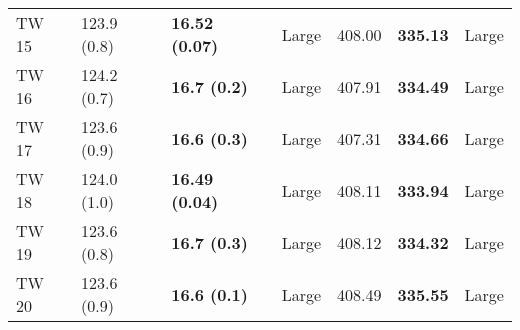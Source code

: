 \begin{tabular}{lllllll}
 TW 15 &       123.9 (0.8) &  \textbf{16.52 (0.07)} &       Large &                  408.00 &          \textbf{335.13} &       Large \\
 TW 16 &       124.2 (0.7) &    \textbf{16.7 (0.2)} &       Large &                  407.91 &          \textbf{334.49} &       Large \\
 TW 17 &       123.6 (0.9) &    \textbf{16.6 (0.3)} &       Large &                  407.31 &          \textbf{334.66} &       Large \\
 TW 18 &       124.0 (1.0) &  \textbf{16.49 (0.04)} &       Large &                  408.11 &          \textbf{333.94} &       Large \\
 TW 19 &       123.6 (0.8) &    \textbf{16.7 (0.3)} &       Large &                  408.12 &          \textbf{334.32} &       Large \\
 TW 20 &       123.6 (0.9) &    \textbf{16.6 (0.1)} &       Large &                  408.49 &          \textbf{335.55} &       Large \\
\bottomrule
\end{tabular}
